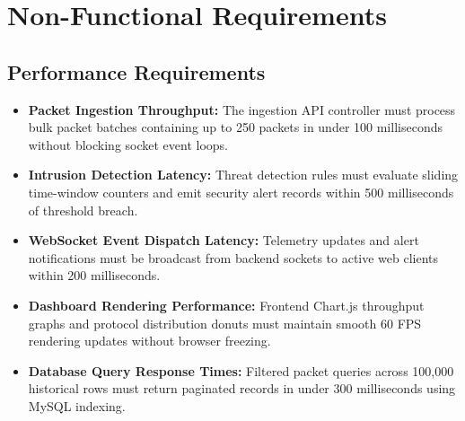 \documentclass[a4paper,12pt]{report}
\begin{document}
	\section{Non-Functional Requirements}
	\subsection{Performance Requirements}
	\begin{itemize}
		\item \textbf{Packet Ingestion Throughput:} The ingestion API controller must process bulk packet batches containing up to 250 packets in under 100 milliseconds without blocking socket event loops.
		\item \textbf{Intrusion Detection Latency:} Threat detection rules must evaluate sliding time-window counters and emit security alert records within 500 milliseconds of threshold breach.
		\item \textbf{WebSocket Event Dispatch Latency:} Telemetry updates and alert notifications must be broadcast from backend sockets to active web clients within 200 milliseconds.
		\item \textbf{Dashboard Rendering Performance:} Frontend Chart.js throughput graphs and protocol distribution donuts must maintain smooth 60 FPS rendering updates without browser freezing.
		\item \textbf{Database Query Response Times:} Filtered packet queries across 100,000 historical rows must return paginated records in under 300 milliseconds using MySQL indexing.
	\end{itemize}
	
\end{document}
